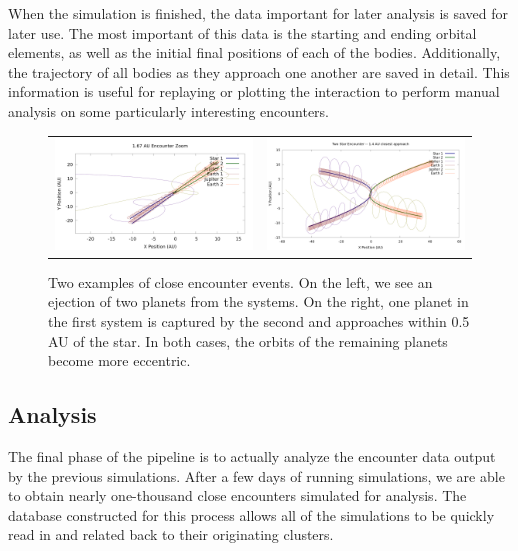 \documentclass[12pt]{article}
\begin{document}
    When the simulation is finished, the data important for later analysis is
    saved for later use. The most important of this data is the starting and ending
    orbital elements, as well as the initial final positions of each of the bodies.
    Additionally, the trajectory of all bodies as they approach one another are
    saved in detail. This information is useful for replaying or plotting the
    interaction to perform manual analysis on some particularly interesting 
    encounters.

    \begin{figure}[H]
        \centering
        \caption{Two examples of close encounter events. On the left, we see
            an ejection of two planets from the systems. On the right, one planet
            in the first system is captured by the second and approaches 
            within 0.5 AU of the star. In both cases, the
            orbits of the remaining planets become more eccentric.
        }
        \begin{tabular}{cc}
            \includegraphics[width=3in]{1_67_AU_zoom} &
            \includegraphics[width=3in]{1.4AU/1_4_AU_encounter_plot}
        \end{tabular}
    \end{figure}

    \subsection{Analysis}

    The final phase of the pipeline is to actually analyze the encounter data 
    output by the previous simulations. After a few days of running simulations,
    we are able to obtain nearly one-thousand close encounters simulated
    for analysis. The database constructed for this process allows all of the
    simulations to be quickly read in and related back to their originating clusters.
\end{document}
